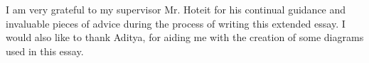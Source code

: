 \documentclass[12pt, oneside]{article}
\begin{document}
I am very grateful to my supervisor Mr. Hoteit for his continual guidance and invaluable pieces of advice during the process of writing this extended essay. I would also like to thank Aditya, for aiding me with the creation of some diagrams used in this essay.

\clearpage
\pagestyle{backmatter}

\printbibliography[heading=bibintoc]{}


\clearpage
\begin{appendices}
    \pagestyle{appendices}
    
    
\end{appendices}
\end{document}

